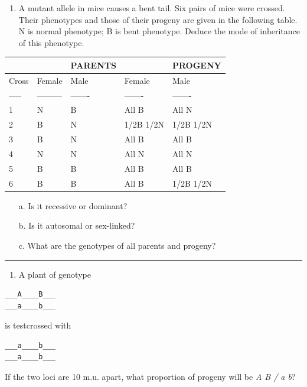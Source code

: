 \documentclass[11pt,]{article}
\providecommand{\tightlist}{%
  \setlength{\itemsep}{0pt}\setlength{\parskip}{0pt}}
\begin{document}
\begin{blackbox}

\begin{enumerate}
\def\labelenumi{\arabic{enumi}.}
\setcounter{enumi}{29}
\tightlist
\item
  A mutant allele in mice causes a bent tail. Six pairs of mice were
  crossed. Their phenotypes and those of their progeny are given in the
  following table. N is normal phenotype; B is bent phenotype. Deduce
  the mode of inheritance of this phenotype.
\end{enumerate}

\hfill\break

\begin{longtable}[]{@{}lllll@{}}
\toprule
& & PARENTS & & PROGENY\tabularnewline
\midrule
\endhead
Cross & Female & Male & Female & Male\tabularnewline
----- & --------- & ------- & ------- & -------\tabularnewline
1 & N & B & All B & All N\tabularnewline
2 & B & N & 1/2B 1/2N & 1/2B 1/2N\tabularnewline
3 & B & N & All B & All B\tabularnewline
4 & N & N & All N & All N\tabularnewline
5 & B & B & All B & All B\tabularnewline
6 & B & B & All B & 1/2B 1/2N\tabularnewline
\bottomrule
\end{longtable}

\begin{enumerate} 
 \item[a.]{ Is it recessive or dominant? } 
 \item[b.]{ Is it autosomal or sex-linked? } 
 \item[c.]{ What are the genotypes of all parents and progeny? } 
 \end{enumerate}

\begin{center}\rule{0.5\linewidth}{0.5pt}\end{center}

\vspace{12cm}

\end{blackbox}

\begin{blackbox}

\begin{enumerate}
\def\labelenumi{\arabic{enumi}.}
\setcounter{enumi}{11}
\tightlist
\item
  A plant of genotype
\end{enumerate}

\hfill\break

\begin{verbatim}
___A____B___
___a____b___
\end{verbatim}

\hfill\break

is testcrossed with

\begin{verbatim}
___a____b___
___a____b___
\end{verbatim}

\hfill\break

If the two loci are 10 m.u. apart, what proportion of progeny will be
\emph{A B / a b}?

\vspace{15cm}

\end{blackbox}
\end{document}
